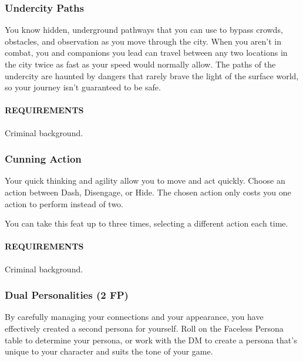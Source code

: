     \subsubsection{Undercity Paths} \label{feat::undercitypaths}
        You know hidden, underground pathways that you can use to bypass crowds, obstacles, and observation as you move through the city.
        When you aren't in combat, you and companions you lead can travel between any two locations in the city twice as fast as your speed would normally allow.
        The paths of the undercity are haunted by dangers that rarely brave the light of the surface world, so your journey isn't guaranteed to be safe.
        \paragraph{REQUIREMENTS} Criminal background.

    \subsubsection{Cunning Action} \label{feat::cunningaction}
        Your quick thinking and agility allow you to move and act quickly.
        Choose an action between Dash, Disengage, or Hide.
        The chosen action only costs you one action to perform instead of two.

        You can take this feat up to three times, selecting a different action each time.
        \paragraph{REQUIREMENTS} Criminal background.

    \subsubsection{Dual Personalities (2 FP)} \label{feat::dualpersonalities}
        By carefully managing your connections and your appearance, you have effectively created a second persona for yourself.
        Roll on the Faceless Persona table to determine your persona, or work with the DM to create a persona that's unique to your character and suits the tone of your game.

